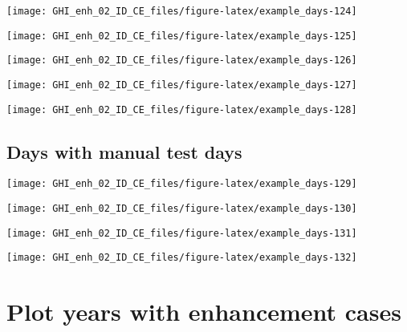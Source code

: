 \documentclass[
  10pt,
  a4paper,oneside]{article}
\begin{document}
\begin{center}\texttt{[image: GHI\_enh\_02\_ID\_CE\_files/figure-latex/example\_days-124]} \end{center}

\begin{center}\texttt{[image: GHI\_enh\_02\_ID\_CE\_files/figure-latex/example\_days-125]} \end{center}

\begin{center}\texttt{[image: GHI\_enh\_02\_ID\_CE\_files/figure-latex/example\_days-126]} \end{center}

\begin{center}\texttt{[image: GHI\_enh\_02\_ID\_CE\_files/figure-latex/example\_days-127]} \end{center}

\begin{center}\texttt{[image: GHI\_enh\_02\_ID\_CE\_files/figure-latex/example\_days-128]} \end{center}

\FloatBarrier

\hypertarget{days-with-manual-test-days}{%
\subsection{Days with manual test days}\label{days-with-manual-test-days}}

\begin{center}\texttt{[image: GHI\_enh\_02\_ID\_CE\_files/figure-latex/example\_days-129]} \end{center}

\begin{center}\texttt{[image: GHI\_enh\_02\_ID\_CE\_files/figure-latex/example\_days-130]} \end{center}

\begin{center}\texttt{[image: GHI\_enh\_02\_ID\_CE\_files/figure-latex/example\_days-131]} \end{center}

\begin{center}\texttt{[image: GHI\_enh\_02\_ID\_CE\_files/figure-latex/example\_days-132]} \end{center}

\newpage
\FloatBarrier

\hypertarget{plot-years-with-enhancement-cases}{%
\section{Plot years with enhancement cases}\label{plot-years-with-enhancement-cases}}
\end{document}
